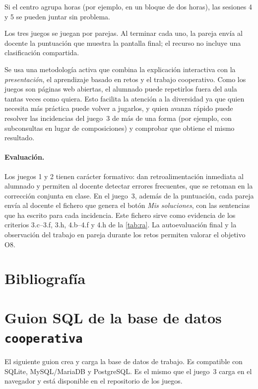 \documentclass[11pt,a4paper]{article}
\begin{document}
Si el centro agrupa horas (por ejemplo, en un bloque de dos horas), las sesiones 4 y 5 se
pueden juntar sin problema.

Los tres juegos se juegan por parejas. Al terminar cada uno, la pareja envía al docente la
puntuación que muestra la pantalla final; el recurso no incluye una clasificación compartida.

Se usa una metodología activa que combina la explicación interactiva con la
\emph{presentación}, el aprendizaje basado en retos y el trabajo cooperativo. Como los
juegos son páginas web abiertas, el alumnado puede repetirlos fuera del aula tantas veces
como quiera. Esto facilita la atención a la diversidad ya que quien necesita más práctica puede
volver a jugarlos, y quien avanza rápido puede resolver las incidencias del juego~3 de más
de una forma (por ejemplo, con subconsultas en lugar de composiciones) y comprobar que
obtiene el mismo resultado. 

\paragraph{Evaluación.} Los juegos 1 y 2 tienen carácter formativo: dan
retroalimentación inmediata al alumnado y permiten al docente detectar errores
frecuentes, que se retoman en la corrección conjunta en clase. En el juego~3, además de la
puntuación, cada pareja envía al docente el fichero que genera el botón \textit{Mis
soluciones}, con las sentencias que ha escrito para cada incidencia. Este fichero sirve como
evidencia de los criterios 3.c–3.f, 3.h, 4.b–4.f y 4.h de la \autoref{tab:ra}. La
autoevaluación final y la observación del trabajo en pareja durante los retos permiten
valorar el objetivo O8.

\section{Bibliografía}

\printbibliography[heading=none]

\appendix
\section{Guion SQL de la base de datos \texttt{cooperativa}}
\label{ap:script}

El siguiente guion crea y carga la base de datos de trabajo. Es compatible con SQLite,
MySQL/MariaDB y PostgreSQL. Es el mismo que el juego~3 carga en el navegador y está
disponible en el repositorio de los juegos.


\end{document}
